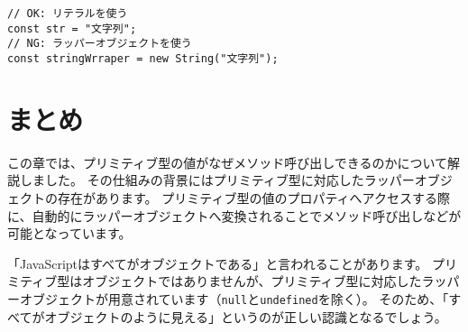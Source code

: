 \begin{lstlisting}
// OK: リテラルを使う
const str = "文字列";
// NG: ラッパーオブジェクトを使う
const stringWrraper = new String("文字列");
\end{lstlisting}

\hypertarget{wrapper-object-summary}{%
\section{まとめ}\label{wrapper-object-summary}}

この章では、プリミティブ型の値がなぜメソッド呼び出しできるのかについて解説しました。
その仕組みの背景にはプリミティブ型に対応したラッパーオブジェクトの存在があります。
プリミティブ型の値のプロパティへアクセスする際に、自動的にラッパーオブジェクトへ変換されることでメソッド呼び出しなどが可能となっています。

「JavaScriptはすべてがオブジェクトである」と言われることがあります。
プリミティブ型はオブジェクトではありませんが、プリミティブ型に対応したラッパーオブジェクトが用意されています（\texttt{null}と\texttt{undefined}を除く）。
そのため、「すべてがオブジェクトのように見える」というのが正しい認識となるでしょう。
